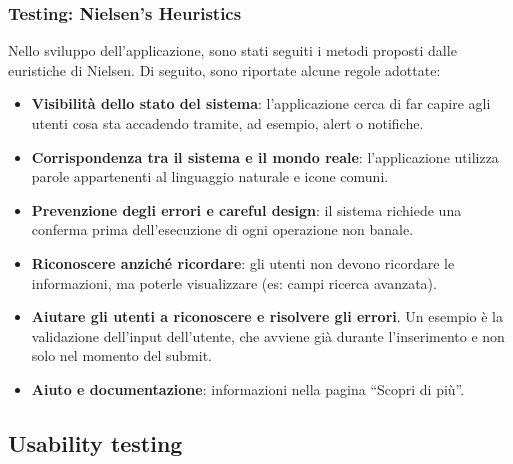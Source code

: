 \documentclass{beamer}
\begin{document}
\begin{frame}
\frametitle{Testing: Nielsen’s Heuristics}

Nello sviluppo dell'applicazione, sono stati seguiti i metodi proposti dalle euristiche di Nielsen. Di seguito, sono riportate alcune regole adottate:
\begin{itemize}
\item \textbf{Visibilità dello stato del sistema}: l'applicazione cerca di far capire agli utenti cosa sta accadendo tramite, ad esempio, alert o notifiche.
\item \textbf{Corrispondenza tra il sistema e il mondo reale}: l'applicazione utilizza parole appartenenti al linguaggio naturale e icone comuni.
\item \textbf{Prevenzione degli errori e careful design}: il sistema richiede una conferma prima  dell'esecuzione di ogni operazione non banale.
\item \textbf{Riconoscere anziché ricordare}: gli utenti non devono ricordare le informazioni, ma poterle visualizzare (es: campi ricerca avanzata).
\item \textbf{Aiutare gli utenti a riconoscere e risolvere gli errori}. Un esempio è la validazione dell'input dell'utente, che avviene già durante l'inserimento e non solo nel momento del submit.
\item \textbf{Aiuto e documentazione}: informazioni nella pagina “Scopri di più”.
\end{itemize}
\end{frame}
\subsection{Usability testing}
\end{document}
